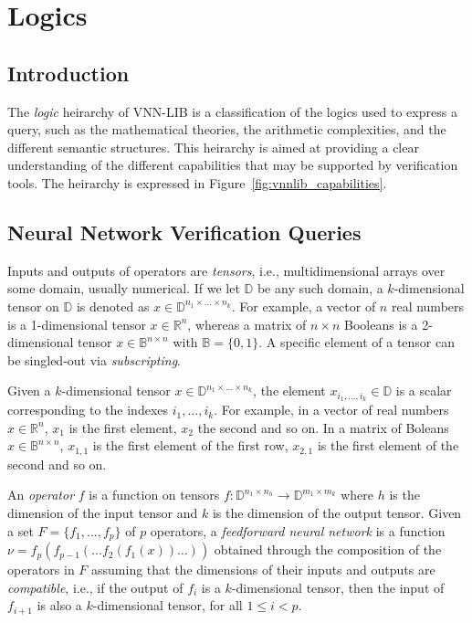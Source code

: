 
\chapter{Logics}
\label{sec:query_categories}

\section{Introduction}

The \textit{logic} heirarchy of VNN-LIB is a classification of the logics used to 
express a query, such as the mathematical theories, the arithmetic complexities, 
and the different semantic structures. This heirarchy is aimed at providing a clear understanding 
of the different capabilities that may be supported by verification tools. The heirarchy 
is expressed in Figure~\ref{fig:vnnlib_capabilities}.

\section{Neural Network Verification Queries}

Inputs and outputs of operators are \emph{tensors}, i.e.,
multidimensional arrays over some domain, usually numerical. 
If we let $\mathbb{D}$ be any such domain, a $k$-dimensional 
tensor on $\mathbb{D}$ is denoted as $x \in \mathbb{D}^{n_1 
	\times \ldots \times n_k}$.
For example, a vector of $n$ real numbers is a 1-dimensional
tensor $x \in \mathbb{R}^n$, whereas a matrix of $n \times n$ 
Booleans is a 2-dimensional tensor $x \in \mathbb{B}^{n 
	\times n}$ with $\mathbb{B} = \{0, 1\}$. A specific element 
of a tensor can be singled-out via \emph{subscripting}. 

Given a $k$-dimensional tensor $x \in \mathbb{D}^{n_1 \times 
	\ldots \times n_k}$, the element $x_{i_1, \ldots, i_k} \in 
	\mathbb{D}$ is a scalar corresponding to the indexes 
${i_1, \ldots, i_k}$. For example, in a vector of real numbers 
$x \in \mathbb{R}^n$, $x_1$ is the first element, $x_2$ the second 
and so on. In a matrix of Boleans $x \in \mathbb{B}^{n \times
  n}$, $x_{1,1}$ is the first element of the first row, $x_{2,1}$ 
is the first element of the second and so on.

An \emph{operator} $f$ is a function on tensors 
$f: \mathbb{D}^{n_{1} \times n_h} \to \mathbb{D}^{m_{1} \times m_k}$
where $h$ is the dimension of the input tensor and $k$ is the 
dimension of the output tensor. Given a set $F = \{f_1, \ldots, 
	f_p\}$ of $p$ operators, a \emph{feedforward neural network}
is a function $\nu = f_p(f_{p-1}(\ldots f_2(f_1(x))\ldots))$ obtained
through the composition of the operators in $F$ assuming that the 
dimensions of their inputs and outputs are \emph{compatible}, i.e.,
if the  output of $f_i$ is a $k$-dimensional tensor, then the input
of $f_{i+1}$ is also a $k$-dimensional tensor, for all $1 \leq i < p$.

